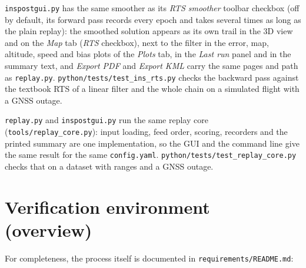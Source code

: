 \documentclass[11pt,a4paper]{article}
\newcommand{\code}[1]{\texttt{#1}}
\begin{document}
\code{inspostgui.py} has the same smoother as its \emph{RTS smoother}
toolbar checkbox (off by default, its forward pass records every epoch
and takes several times as long as the plain replay): the
smoothed solution appears as its own trail in the 3D view and on the
\emph{Map} tab (\emph{RTS} checkbox), next to the filter in the error,
map, altitude, speed and bias plots of the \emph{Plots} tab, in the
\emph{Last run} panel and in the summary text, and \emph{Export PDF} and
\emph{Export KML} carry the same pages and path as \code{replay.py}. \code{python/\allowbreak{}tests/\allowbreak{}test\_\allowbreak{}ins\_\allowbreak{}rts.py}
checks the backward pass against the textbook RTS of a linear filter and
the whole chain on a simulated flight with a GNSS outage.

\code{replay.py} and \code{inspostgui.py} run the same replay core
(\code{tools/\allowbreak{}replay\_\allowbreak{}core.py}): input loading, feed
order, scoring, recorders and the printed summary are one implementation,
so the GUI and the command line give the same result for the same
\code{config.yaml}. \code{python/tests/test\_\allowbreak{}replay\_\allowbreak{}core.py}
checks that on a dataset with ranges and a GNSS outage.


\section{Verification environment (overview)}

For completeness, the process itself is documented in
\code{requirements/README.md}:
\end{document}
